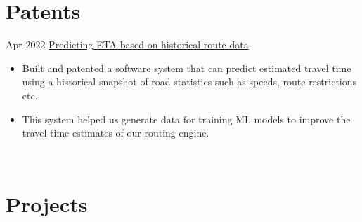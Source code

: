 \documentclass[letterpaper]{DS_class_file} %
\begin{document}
\section{Patents}

\begin{twenty} %
	\twentyitem
	{Apr 2022}
	{}
	{\hspace{0.3cm}\href{https://patents.justia.com/patent/20220343248}{Predicting ETA based on historical route data}}
	{}
	{}
	{
		{\begin{itemize}
			\item Built and patented a software system that can predict estimated travel time using a historical snapshot of road statistics such as speeds, route restrictions etc.
            \item This system helped us generate data for training ML models to improve the travel time estimates of our routing engine.

		\end{itemize}}
	}
	\\

\end{twenty}

\newpage

\makeseconda %

\section{Projects}
\end{document}
